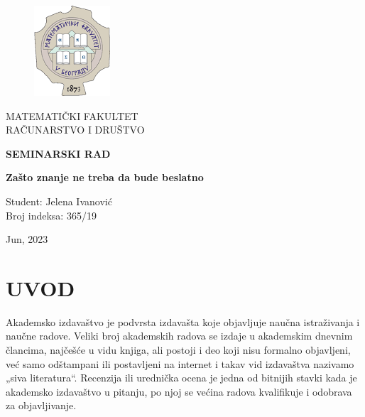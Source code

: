 \documentclass[12pt,a4paper]{article}
\begin{document}
\begin{titlepage}
	\begin{center}
		\vspace{1cm}
		
		\begin{figure} [h]
		\centering
		\includegraphics{logo.png}
		\end{figure}

		

		\vspace{0.5cm}
		\large MATEMATIČKI FAKULTET\\
		\large  RAČUNARSTVO I DRUŠTVO

		\vspace{3cm}

		\textbf{SEMINARSKI RAD}

		\vspace{3cm}

		\textbf{\Huge \vspace{0.5cm} Zašto znanje ne treba da bude beslatno}

		\vfill

		\vspace{0.8cm}

		Student: Jelena Ivanović\\
		Broj indeksa: 365/19\\

		\vspace{1cm}

		Jun, 2023
	\end{center}
\end{titlepage}

\tableofcontents
\newpage
\listoffigures
\newpage
 
\section{\large{\textbf{UVOD}}}

\indent  Akademsko izdavaštvo je podvrsta izdavašta koje objavljuje naučna istraživanja i naučne radove. Veliki broj akademskih radova se izdaje u akademskim dnevnim člancima, najčešće u vidu knjiga, ali postoji i deo koji nisu formalno objavljeni, već samo odštampani ili postavljeni na internet i takav vid izdavaštva nazivamo „siva literatura“. Recenzija ili urednička ocena je jedna od bitnijih stavki kada je akademsko izdavaštvo u pitanju, po njoj se većina radova kvalifikuje i odobrava za objavljivanje.
\end{document}
